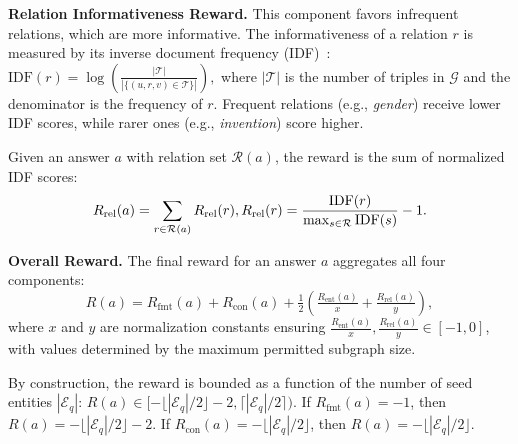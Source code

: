 \textbf{Relation Informativeness Reward.} This component favors infrequent relations, which are more informative.
The informativeness of a relation $r$ is measured by its inverse document frequency (IDF)~\citep{robertson2004understanding}:
\small
$
\mathrm{IDF}(r) = \log \!\left(\frac{|\mathcal{T}|}{|\{(u,r,v)\in \mathcal{T}\}|}\right),
$
\normalsize
where $|\mathcal{T}|$ is the number of triples in $\mathcal{G}$ and the denominator is the frequency of $r$.  
Frequent relations (e.g., \textit{gender}) receive lower IDF scores, while rarer ones (e.g., \textit{invention}) score higher. 

Given an answer $a$ with relation set $\mathcal{R}(a)$, the reward is the sum of normalized IDF scores:
\small
\begin{equation}\label{eq:relation_informativenss}
\vspace{-1em}
R_{\mathrm{rel}}(a) = \sum_{r \in \mathcal{R}(a)} R_{\mathrm{rel}}(r),
R_{\mathrm{rel}}(r) = \frac{\mathrm{IDF}(r)}{\max\nolimits_{s \in \mathcal{R}} \mathrm{IDF}(s)} - 1.
\end{equation}
\normalsize


\textbf{Overall Reward.}  
The final reward for an answer $a$ aggregates all four components:
\small
\begin{equation}\label{eq:reward}
    R(a) = R_{\mathrm{fmt}}(a) 
+ R_{\mathrm{con}}(a) 
+ \tfrac{1}{2}\!\left(\tfrac{R_{\mathrm{ent}}(a)}{x} 
+ \tfrac{R_{\mathrm{rel}}(a)}{y}\right),
\end{equation}
\normalsize
where $x$ and $y$ are normalization constants ensuring  
$\tfrac{R_{\mathrm{ent}}(a)}{x}, \tfrac{R_{\mathrm{rel}}(a)}{y} \in [-1,0]$,  
with values determined by the maximum permitted subgraph size.  

By construction, the reward is bounded as a function of the number of seed entities $|\mathcal{E}_q|$: $R(a) \in [-\lfloor |\mathcal{E}_q|/2 \rfloor- 2, \lceil |\mathcal{E}_q|/2 \rceil)$.
If $R_{\mathrm{fmt}}(a)=-1$, then $R(a)=-\lfloor |\mathcal{E}_q|/2 \rfloor- 2$.  
If $R_{\mathrm{con}}(a)=-\lfloor |\mathcal{E}_q|/2 \rfloor$,  
then $R(a)=-\lfloor |\mathcal{E}_q|/2 \rfloor$.



